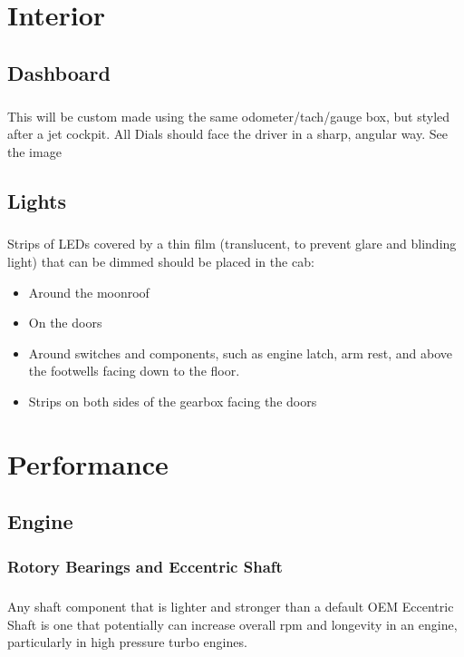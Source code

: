\documentclass[a4paper,10pt]{report}
\begin{document}
\chapter{Interior}
\section{Dashboard}
\paragraph*{} This will be custom made using the same odometer/tach/gauge box, but styled after a jet cockpit. All Dials should face the driver in a sharp, angular way. See the image %
\section{Lights}
\paragraph*{}Strips of LEDs covered by a thin film (translucent, to prevent glare and blinding light) that can be dimmed should be placed in the cab: 
\begin{itemize}
 \item Around the moonroof
 \item On the doors
 \item Around switches and components, such as engine latch, arm rest, and above the footwells facing down to the floor.
 \item Strips on both sides of the gearbox facing the doors
\end{itemize}


\chapter{Performance}
\section{Engine}
\subsection{Rotory Bearings and Eccentric Shaft} 
\paragraph*{}Any shaft component that is lighter and stronger than a default OEM Eccentric Shaft is one that potentially can increase overall rpm and longevity in an engine, particularly in high pressure turbo engines.
\end{document}
